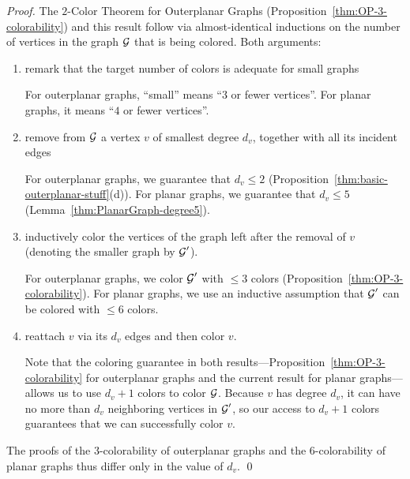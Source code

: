 \begin{proof}
The $2$-Color Theorem for Outerplanar Graphs (Proposition~\ref{thm:OP-3-colorability}) 
and this result follow via almost-identical inductions on the number of vertices in the graph $\mbox{$\cal G$}$
that is being colored.  Both arguments:
\begin{enumerate}
\item
remark that the target number of colors is adequate for small graphs

For outerplanar graphs, ``small'' means ``$3$ or fewer vertices''.  For
planar graphs, it means ``$4$ or fewer vertices''.

\item
remove from $\mbox{$\cal G$}$ a vertex $v$ of smallest degree $d_v$, together with
all its incident edges

For outerplanar graphs, we guarantee that $d_v \leq 2$ (Proposition~\ref{thm:basic-outerplanar-stuff}(d)).
For planar graphs, we guarantee that $d_v \leq 5$ (Lemma~\ref{thm:PlanarGraph-degree5}).

\item
inductively color the vertices of the graph left after the removal of $v$ (denoting the smaller
graph by $\mbox{$\cal G$}'$).

For outerplanar graphs, we color $\mbox{$\cal G$}'$ with $\leq 3$ colors (Proposition~\ref{thm:OP-3-colorability}).
For planar graphs, we use an inductive assumption that $\mbox{$\cal G$}'$ can be colored with $\leq 6$ colors. 

\item
reattach $v$ via its $d_v$ edges and then color $v$.

Note that the coloring guarantee in both results---Proposition~\ref{thm:OP-3-colorability}
for outerplanar graphs and the current result for planar graphs---allows us to use $d_v +1$ colors 
to color $\mbox{$\cal G$}$.  Because $v$ has degree $d_v$, it can have no more than $d_v$ neighboring 
vertices in $\mbox{$\cal G$}'$, so our access to $d_v +1$ colors guarantees that we can successfully color $v$.
\end{enumerate}
The proofs of the $3$-colorability of outerplanar graphs and the
$6$-colorability of planar graphs thus differ only in the value of
$d_v$.  \qed
\end{proof}

\bigskip


\bigskip

